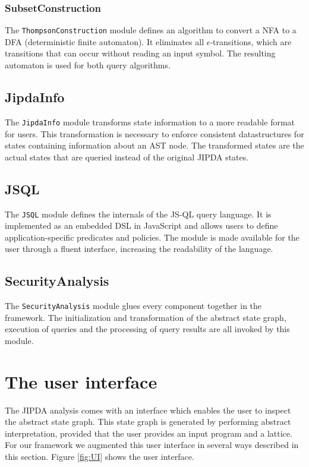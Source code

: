 \subsubsection*{SubsetConstruction}
The \texttt{ThompsonConstruction} module defines an algorithm to convert a NFA to a DFA (deterministic finite automaton). It eliminates all $\epsilon$-transitions, which are transitions that can occur without reading an input symbol. The resulting automaton is used for both query algorithms.

\subsection*{JipdaInfo}
The \texttt{JipdaInfo} module transforms state information to a more readable format for users. This transformation is necessary to enforce consistent datastructures for states containing information about an AST node. The transformed states are the actual states that are queried instead of the original JIPDA states.

\subsection*{JSQL}
The \texttt{JSQL} module defines the internals of the JS-QL query language. It is implemented as an embedded DSL in JavaScript and allows users to define application-specific predicates and policies. The module is made available for the user through a fluent interface, increasing the readability of the language.

\subsection*{SecurityAnalysis}
The \texttt{SecurityAnalysis} module glues every component together in the framework. The initialization and transformation of the abstract state graph, execution of queries and the processing of query results are all invoked by this module.

\section{The user interface}
The JIPDA analysis comes with an interface which enables the user to inspect the abstract state graph. This state graph is generated by performing abstract interpretation, provided that the user provides an input program and a lattice. For our framework we augmented this user interface in several ways described in this section. Figure \ref{fig:UI} shows the user interface.

